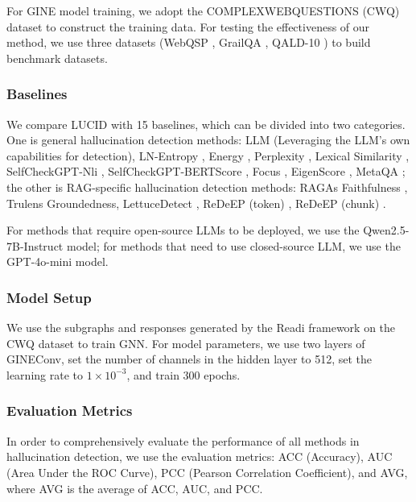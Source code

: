 \documentclass[11pt]{article}
\begin{document}
For GINE model training, we adopt the COMPLEXWEBQUESTIONS (CWQ) \cite{talmor2018web} dataset to construct the training data. For testing the effectiveness of our method, we use three datasets (WebQSP \cite{yih2016value}, GrailQA \cite{gu2021beyond}, QALD-10 \cite{perevalov2022qald}) to build benchmark datasets. 

\subsubsection{Baselines}

We compare LUCID with 15 baselines, which can be divided into two categories. One is general hallucination detection methods: LLM (Leveraging the LLM's own capabilities for detection), LN-Entropy \cite{malinin2020uncertainty}, Energy \cite{liu2020energy}, Perplexity \cite{ren2022out}, Lexical Similarity \cite{lin2022towards}, SelfCheckGPT-Nli \cite{manakul2023selfcheckgpt}, SelfCheckGPT-BERTScore \cite{manakul2023selfcheckgpt}, Focus \cite{zhang2023enhancing}, EigenScore \cite{chen2024inside}, MetaQA \cite{yang2025hallucination}; the other is RAG-specific hallucination detection methods: RAGAs Faithfulness \cite{es2024ragas}, Trulens Groundedness, LettuceDetect \cite{kovacs2025lettucedetect}, ReDeEP (token) \cite{sun2025redeep}, ReDeEP (chunk) \cite{sun2025redeep}. 

For methods that require open-source LLMs to be deployed, we use the Qwen2.5-7B-Instruct model; for methods that need to use closed-source LLM, we use the GPT-4o-mini model.

\subsubsection{Model Setup}
We use the subgraphs and responses generated by the Readi framework on the CWQ dataset to train GNN. For model parameters, we use two layers of GINEConv, set the number of channels in the hidden layer to 512, set the learning rate to $1\times10^{-3}$, and train 300 epochs.

\subsubsection{Evaluation Metrics} 
In order to comprehensively evaluate the performance of all methods in hallucination detection, we use the evaluation metrics: ACC (Accuracy), AUC (Area Under the ROC Curve), PCC (Pearson Correlation Coefficient), and AVG, where AVG is the average of ACC, AUC, and PCC.
\end{document}
